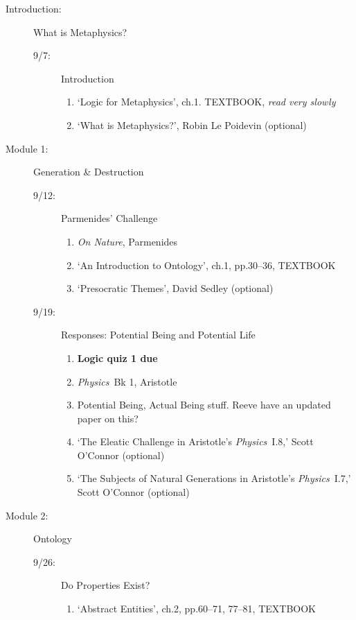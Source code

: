 \documentclass[article,oneside]{memoir}
\begin{document}
\begin{description}
\item[Introduction:]  What  is Metaphysics? 
\begin{description}
\item [9/7:] Introduction
\begin{enumerate}
\item `Logic for Metaphysics', ch.1. TEXTBOOK, \emph{read very slowly}
\item `What is Metaphysics?', Robin Le Poidevin (optional)
\end{enumerate}
\end{description}

\item[Module 1:] Generation \& Destruction
\begin{description}
\item [9/12:] Parmenides' Challenge
\begin{enumerate}
\item \emph{On Nature}, Parmenides
\item `An Introduction to Ontology', ch.1, pp.30--36, TEXTBOOK
\item `Presocratic Themes', David Sedley (optional)
\end{enumerate}

\item [9/19:] Responses: Potential Being and Potential Life 
\begin{enumerate}
\item \textbf{Logic quiz 1 due}
\item \emph{Physics}\ Bk 1, Aristotle
\item Potential Being, Actual Being stuff. Reeve have an updated paper on this?
\item `The Eleatic Challenge in Aristotle's \emph{Physics}\ I.8,' Scott O'Connor (optional)
\item `The Subjects of Natural Generations in Aristotle's \emph{Physics}\ I.7,' Scott O'Connor (optional)
 
\end{enumerate}
\end{description}

\item[Module 2:] Ontology
\begin{description}

\item [9/26:] Do Properties Exist? 

\begin{enumerate}
\item `Abstract Entities', ch.2, pp.60--71, 77--81, TEXTBOOK
\end{enumerate}


\end{description}
\end{description}
\end{document}
